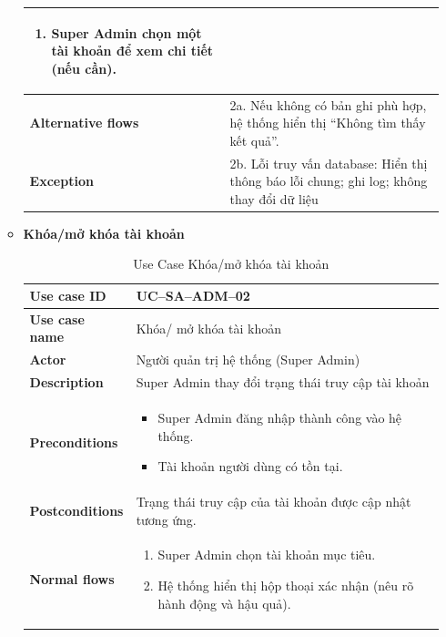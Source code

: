 \begin{enumerate}[label=\textbf{\alph*)}]
\begin{itemize}
\begin{center}
\begin{longtable}{|m{}|m{}|}
\begin{enumerate}[label=\arabic*.]
            \item Super Admin chọn một tài khoản để xem chi tiết (nếu cần).
          \end{enumerate}\\
          \hline
          \textbf{Alternative flows} & 2a. Nếu không có bản ghi phù hợp, hệ thống hiển thị “Không tìm thấy kết quả”.\\
          \hline
          \textbf{Exception} &
          2b. Lỗi truy vấn database: Hiển thị thông báo lỗi chung; ghi log; không thay đổi dữ liệu\\
          \hline
          \end{longtable}
      \end{center}
    \item \textbf{Khóa/mở khóa tài khoản}
      \begin{center}
        \renewcommand{\arraystretch}{1.5}
        \begin{longtable}{|m{}|m{}|}
          \caption{Use Case Khóa/mở khóa tài khoản}
          \label{tab:uc_sa_adm_02} \\
          \hline
          \textbf{Use case ID} & UC--SA--ADM--02 \\
          \hline
          \textbf{Use case name} & Khóa/ mở khóa tài khoản \\
          \hline
          \textbf{Actor} & Người quản trị hệ thống (Super Admin) \\
          \hline
          \textbf{Description} & Super Admin thay đổi trạng thái truy cập tài khoản \\
          \hline
          \textbf{Preconditions} &
          \begin{itemize}
            \item Super Admin đăng nhập thành công vào hệ thống.
            \item Tài khoản người dùng có tồn tại.
          \end{itemize}\\
          \hline
          \textbf{Postconditions} &
          Trạng thái truy cập của tài khoản được cập nhật tương ứng.\\
          \hline
          \textbf{Normal flows} &
          \begin{enumerate}[label=\arabic*.]
            \item Super Admin chọn tài khoản mục tiêu.
            \item Hệ thống hiển thị hộp thoại xác nhận (nêu rõ hành động và hậu quả).

\end{enumerate}
\end{longtable}
\end{center}
\end{itemize}
\end{enumerate}
